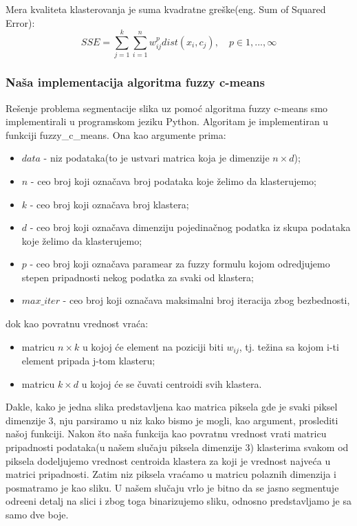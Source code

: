 \documentclass{article}
\begin{document}
Mera kvaliteta klasterovanja je suma kvadratne gre\v{s}ke(eng. {\selectfont Sum of Squared Error}):
\begin{equation}
SSE = \sum_{j=1}^k\sum_{i=1}^n w_{ij}^p dist(x_i, c_j), \quad p \in 1,...,\infty
\end{equation}

\subsubsection{\selectfont Na\v{s}a implementacija algoritma {\selectfont fuzzy c-means}}

Re\v{s}enje problema segmentacije slika uz pomo\'{c} algoritma {\selectfont fuzzy c-means} smo implementirali u programskom jeziku {\selectfont Python}. Algoritam je implementiran u funkciji {\selectfont fuzzy\_c\_means}. Ona kao argumente prima:
\begin{itemize}
\item $data$ - niz podataka(to je ustvari matrica koja je dimenzije $n \times d$);
\item $n$ - ceo broj koji ozna\v{c}ava broj podataka koje \v{z}elimo da klasterujemo;
\item $k$ - ceo broj koji ozna\v{c}ava broj klastera;
\item $d$ - ceo broj koji ozna\v{c}ava dimenziju pojedina\v{c}nog podatka iz skupa podataka koje \v{z}elimo da klasterujemo;
\item $p$ - ceo broj koji ozna\v{c}ava paramear za {\selectfont fuzzy} formulu kojom odredjujemo stepen pripadnosti nekog podatka za svaki od klastera;
\item $max\_iter$ - ceo broj koji ozna\v{c}ava maksimalni broj iteracija zbog bezbednosti,
\end{itemize}
dok kao povratnu vrednost vra\'{c}a:
\begin{itemize} 
\item matricu $n \times k$ u kojoj \'{c}e element na poziciji biti $w_{ij}$, tj. te\v{z}ina sa kojom {\selectfont i}-ti element pripada {\selectfont j}-tom klasteru;
\item matricu $k \times d$ u kojoj \'{c}e se \v{c}uvati centroidi svih klastera.
\end{itemize}
Dakle, kako je jedna slika predstavljena kao matrica piksela gde je svaki piksel dimenzije 3, nju parsiramo u niz kako bismo je mogli, kao argument, proslediti na\v{s}oj funkciji. Nakon \v{s}to na\v{s}a funkcija kao povratnu vrednost vrati matricu pripadnosti podataka(u na\v{s}em slu\v{c}aju piksela dimenzije 3) klasterima svakom od piksela dodeljujemo vrednost centroida klastera za koji je vrednost najve\'ca u matrici pripadnosti. Zatim niz piksela vra\'{c}amo u matricu polaznih dimenzija i posmatramo je kao sliku. U na\v{s}em slu\v{c}aju vrlo je bitno da se jasno segmentuje odre\dj eni detalj na slici i zbog toga binarizujemo sliku, odnosno predstavljamo je sa samo dve boje.\\
\end{document}
